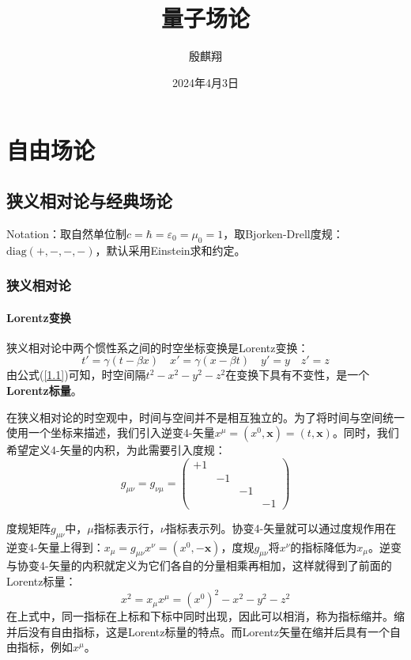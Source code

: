 \documentclass{book}
\title{量子场论}
\author{殷麒翔}
\date{2024年4月3日}
\begin{document}
\maketitle
\clearpage  %
\tableofcontents  %
\clearpage  %
\pagestyle{headings}  %

\part{自由场论}
\chapter{狭义相对论与经典场论}
\noindent Notation：取自然单位制$c=\hbar=\varepsilon_0=\mu_0=1$，取Bjorken-Drell度规：$\mathrm{diag}(+,-,-,-)$，默认采用Einstein求和约定。
\section{狭义相对论}
\subsection{Lorentz变换}
狭义相对论中两个惯性系之间的时空坐标变换是Lorentz变换：
\begin{equation}
	t'=\gamma(t-\beta x)\quad x'=\gamma(x-\beta t)\quad y'=y\quad z'=z
	\label{1.1}
\end{equation}
由公式(\ref{1.1})可知，时空间隔$t^2-x^2-y^2-z^2$在变换下具有不变性，是一个\textbf{Lorentz标量}。

在狭义相对论的时空观中，时间与空间并不是相互独立的。为了将时间与空间统一使用一个坐标来描述，我们引入逆变4-矢量$x^\mu=(x^0,\mathbf{x})=(t,\mathbf{x})$。同时，我们希望定义4-矢量的内积，为此需要引入度规：
\begin{equation}
	g_{\mu\nu}=g_{\nu\mu}=\begin{pmatrix}+1\\&-1\\&&-1\\&&&-1\end{pmatrix}
\end{equation}

度规矩阵$g_{\mu\nu}$中，$\mu$指标表示行，$\nu$指标表示列。协变4-矢量就可以通过度规作用在逆变4-矢量上得到：$x_\mu=g_{\mu\nu}x^\nu=(x^0,-\mathbf{x})$，度规$g_{\mu\nu}$将$x^\nu$的指标降低为$x_\mu$。逆变与协变4-矢量的内积就定义为它们各自的分量相乘再相加，这样就得到了前面的Lorentz标量：
\begin{equation}
	x^2=x_\mu x^\mu=(x^0)^2-x^2-y^2-z^2
\end{equation}
在上式中，同一指标在上标和下标中同时出现，因此可以相消，称为指标缩并。缩并后没有自由指标，这是Lorentz标量的特点。而Lorentz矢量在缩并后具有一个自由指标，例如$x^\mu$。 
\end{document}
